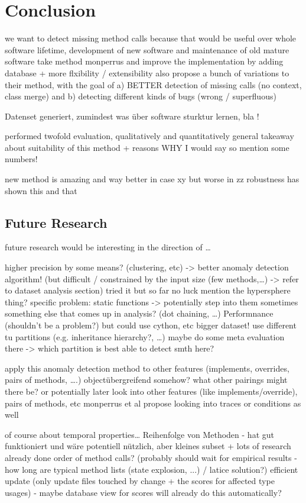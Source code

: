 \chapter{Conclusion}\label{ch:concl}

we want to detect missing method calls
because that would be useful over whole software lifetime, development of new software and maintenance of old mature software
take method monperrus and improve the implementation by adding database + more flxibility / extensibility
also propose a bunch of variations to their method, with the goal of a) BETTER detection of missing calls (no context, class merge)
and b) detecting different kinds of bugs (wrong / superfluous)

Datenset generiert, zumindest was über software sturktur lernen, bla !

performed twofold evaluation, qualitatively and quantitatively
general takeaway about suitability of this method + reasons WHY I would say so
mention some numbers!

new method is amazing and way better in case xy but worse in zz
robustness has shown this and that

\section{Future Research}

future research would be interesting in the direction of \ldots

higher precision by some means? (clustering, etc)
-> better anomaly detection algorithm! (but difficult / constrained by the input size (few methods,\ldots) -> refer to dataset analysis section)
    tried it but so far no luck
    mention the hypersphere thing?
specific problem: static functions -> potentially step into them sometimes
something else that comes up in analysis? (dot chaining, \ldots)
Performnance (shouldn't be a problem?)
    but could use cython, etc
bigger dataset!
use different tu partitions (e.g. inheritance hierarchy?, \ldots)
    maybe do some meta evaluation there -> which partition is best able to detect smth here?

apply this anomaly detection method to other features (implements, overrides, pairs of methods, \ldots.)
    objectübergreifend somehow?
    what other pairings might there be?
or potentially later look into other features (like implements/override), pairs of methods, etc
monperrus et al propose looking into traces or conditions as well

of course about temporal properties\ldots
Reihenfolge von Methoden - hat gut funktioniert und wäre potentiell nützlich, aber kleines subset + lots of research already done
order of method calls? (probably should wait for empirical results - how long are typical method lists (state explosion, ...) / latice solution?)
efficient update (only update files touched by change + the scores for affected type usages) - maybe database view for scores will already do this automatically? 


